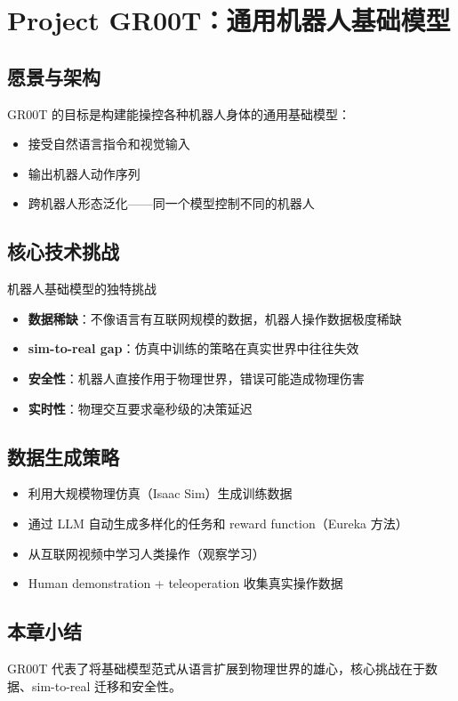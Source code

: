 \section{Project GR00T：通用机器人基础模型}

\subsection{愿景与架构}

GR00T 的目标是构建能操控各种机器人身体的通用基础模型：

\begin{itemize}
    \item 接受自然语言指令和视觉输入
    \item 输出机器人动作序列
    \item 跨机器人形态泛化——同一个模型控制不同的机器人
\end{itemize}

\subsection{核心技术挑战}

\begin{warningbox}{机器人基础模型的独特挑战}
\begin{itemize}
    \item \textbf{数据稀缺}：不像语言有互联网规模的数据，机器人操作数据极度稀缺
    \item \textbf{sim-to-real gap}：仿真中训练的策略在真实世界中往往失效
    \item \textbf{安全性}：机器人直接作用于物理世界，错误可能造成物理伤害
    \item \textbf{实时性}：物理交互要求毫秒级的决策延迟
\end{itemize}
\end{warningbox}

\subsection{数据生成策略}

\begin{itemize}
    \item 利用大规模物理仿真（Isaac Sim）生成训练数据
    \item 通过 LLM 自动生成多样化的任务和 reward function（Eureka 方法）
    \item 从互联网视频中学习人类操作（观察学习）
    \item Human demonstration + teleoperation 收集真实操作数据
\end{itemize}

\subsection{本章小结}

GR00T 代表了将基础模型范式从语言扩展到物理世界的雄心，核心挑战在于数据、sim-to-real 迁移和安全性。

